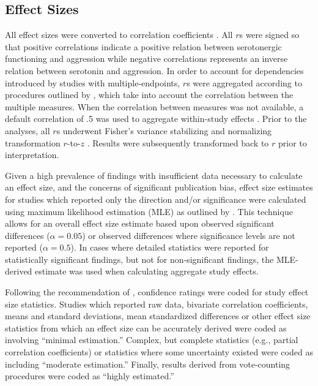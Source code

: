 \subsection{Effect Sizes}
All effect sizes were converted to correlation coefficients \parencite{Borenstein09}. All $r$s were signed so that positive correlations indicate a positive relation between serotonergic functioning and aggression while negative correlations represents an inverse relation between serotonin and aggression. In order to account for dependencies introduced by studies with multiple-endpoints, $r$s were aggregated according to procedures outlined by \textcite{GleserOlkin2009}, which take into account the correlation between the multiple measures. When the correlation between measures was not available, a default correlation of .5 was used to aggregate within-study effects \parencite{Wampold1997}. Prior to the analyses, all $r$s underwent Fisher's variance stabilizing and normalizing transformation $r$-to-$z$ \parencite{FishersZ}.  Results were subsequently transformed back to $r$ prior to interpretation.


Given a high prevalence of findings with insufficient data necessary to calculate an effect size, and the concerns of significant publication bias, effect size estimates for studies which reported only the direction and/or significance were calculated using maximum likelihood estimation (MLE) as outlined by \textcite{BushmanWang09}. This technique allows for an overall effect size estimate based upon observed significant differences ($\alpha = 0.05$) or observed differences where significance levels are not reported ($\alpha = 0.5$). In cases where detailed statistics were reported for statistically significant findings, but not for non-significant findings, the MLE-derived estimate was used when calculating aggregate study effects.


Following the recommendation of \textcite{Orwin85}, confidence ratings were coded for study effect size statistics. Studies which reported raw data, bivariate correlation coefficients, means and standard deviations, mean standardized differences or other effect size statistics from which an effect size can be accurately derived were coded as involving ``minimal estimation.'' Complex, but complete statistics (e.g., partial correlation coefficients) or statistics where some uncertainty existed were coded as including ``moderate estimation.'' Finally, results derived from vote-counting procedures were coded as ``highly estimated.''



